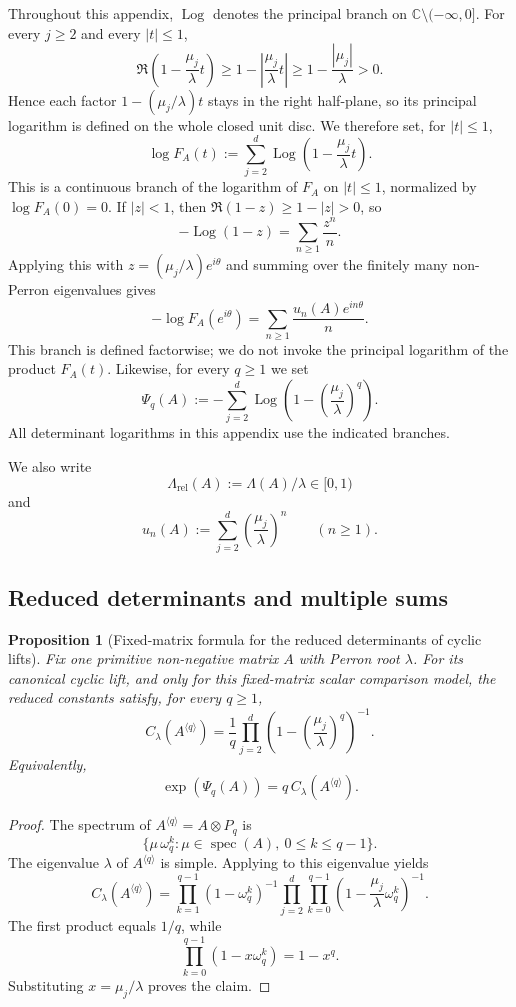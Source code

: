 \documentclass[11pt,a4paper]{amsart}
\theoremstyle{plain}
\newtheorem{proposition}[theorem]{Proposition}
\theoremstyle{definition}
\theoremstyle{remark}
\DeclareMathOperator{\spec}{spec}
\DeclareMathOperator{\Log}{Log}
\newcommand{\CC}{\mathbb{C}}
\begin{document}
Throughout this appendix, \(\Log\) denotes the principal branch on
\(\CC\setminus(-\infty,0]\). For every \(j\ge 2\) and every \(|t|\le 1\),
\[
  \Re\!\left(1-\frac{\mu_j}{\lambda}t\right)
  \ge 1-\left|\frac{\mu_j}{\lambda}t\right|
  \ge 1-\frac{|\mu_j|}{\lambda}
  >0.
\]
Hence each factor \(1-(\mu_j/\lambda)t\) stays in the right half-plane,
so its principal logarithm is defined on the whole closed unit disc. We
therefore set, for \(|t|\le 1\),
\[
  \log F_A(t)
  :=
  \sum_{j=2}^d \Log\!\left(1-\frac{\mu_j}{\lambda}t\right).
\]
This is a continuous branch of the logarithm of \(F_A\) on \(|t|\le 1\),
normalized by \(\log F_A(0)=0\). If \(|z|<1\), then
\(\Re(1-z)\ge 1-|z|>0\), so
\[
  -\Log(1-z)=\sum_{n\ge 1}\frac{z^n}{n}.
\]
Applying this with \(z=(\mu_j/\lambda)e^{i\theta}\) and summing over the
finitely many non-Perron eigenvalues gives
\[
  -\log F_A(e^{i\theta})
  =
  \sum_{n\ge 1}\frac{u_n(A)e^{in\theta}}{n}.
\]
This branch is defined factorwise; we do not invoke the principal
logarithm of the product \(F_A(t)\). Likewise, for every \(q\ge 1\) we
set
\[
  \Psi_q(A)
  :=
  -\sum_{j=2}^d
    \Log\!\left(1-\left(\frac{\mu_j}{\lambda}\right)^q\right).
\]
All determinant logarithms in this appendix use the indicated branches.

We also write
\[
  \Lambda_{\mathrm{rel}}(A):=\Lambda(A)/\lambda\in[0,1)
\]
and
\[
  u_n(A):=\sum_{j=2}^d\left(\frac{\mu_j}{\lambda}\right)^n
  \qquad (n\ge 1).
\]

\subsection{Reduced determinants and multiple sums}

\begin{proposition}[Fixed-matrix formula for the reduced
  determinants of cyclic lifts]
  \label{prop:finite-part-cyclic-lift-reduced-constant-closed}
  Fix one primitive non-negative matrix \(A\) with Perron root \(\lambda\).
  For its canonical cyclic lift, and only for this fixed-matrix scalar
  comparison model, the reduced constants satisfy, for every \(q\ge 1\),
  \[
    C_\lambda(A^{\langle q\rangle})
    =\frac{1}{q}\prod_{j=2}^d
      \left(1-\left(\frac{\mu_j}{\lambda}\right)^q\right)^{-1}.
  \]
  Equivalently,
  \[
    \exp(\Psi_q(A))
    =
    q\,C_\lambda(A^{\langle q\rangle}).
  \]
\end{proposition}

\begin{proof}
  The spectrum of \(A^{\langle q\rangle}=A\otimes P_q\) is
  \[
    \{\mu\,\omega_q^k:\mu\in\spec(A),\ 0\le k\le q-1\}.
  \]
  The eigenvalue \(\lambda\) of \(A^{\langle q\rangle}\) is simple.
  Applying  to this
  eigenvalue yields
  \[
    C_\lambda(A^{\langle q\rangle})
    =\prod_{k=1}^{q-1}(1-\omega_q^k)^{-1}
      \prod_{j=2}^d\prod_{k=0}^{q-1}
        \left(1-\frac{\mu_j}{\lambda}\omega_q^k\right)^{-1}.
  \]
  The first product equals \(1/q\), while
  \[
    \prod_{k=0}^{q-1}(1-x\omega_q^k)=1-x^q.
  \]
  Substituting \(x=\mu_j/\lambda\) proves the claim.
\end{proof}
\end{document}
